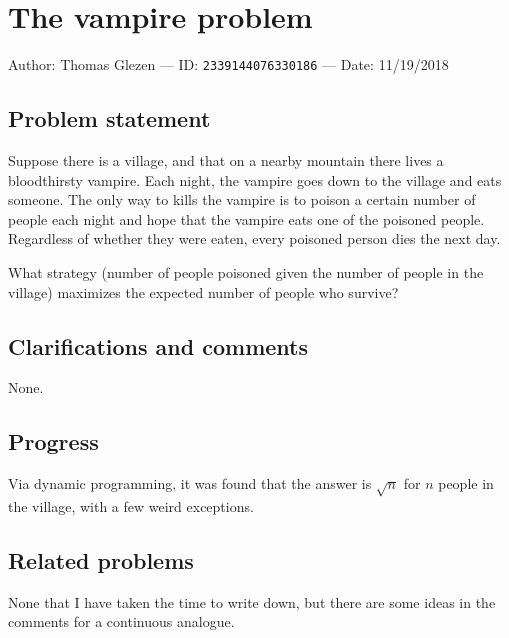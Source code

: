 
\section{The vampire problem}

Author: Thomas Glezen --- ID: \verb`2339144076330186` --- Date: 11/19/2018

\subsection{Problem statement}

Suppose there is a village, and that on a nearby mountain there lives a bloodthirsty vampire. Each night, the vampire goes down to the village and eats someone. The only way to kills the vampire is to poison a certain number of people each night and hope that the vampire eats one of the poisoned people. Regardless of whether they were eaten, every poisoned person dies the next day.

What strategy (number of people poisoned given the number of people in the village) maximizes the expected number of people who survive?

\subsection{Clarifications and comments}

None.

\subsection{Progress}

Via dynamic programming, it was found that the answer is $\sqrt{n}$ for $n$ people in the village, with a few weird exceptions.

\subsection{Related problems}

None that I have taken the time to write down, but there are some ideas in the comments for a continuous analogue.


